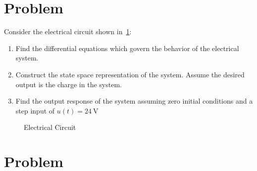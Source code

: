 \documentclass[titlepage, 11pt, reqno]{article}    %
\begin{document}
\section{Problem}
Consider the electrical circuit shown in~\cref{fig:elec_circuit}:
\begin{enumerate}
    \item Find the differential equations which govern the behavior of the electrical system.
    \item Construct the state space representation of the system. 
        Assume the desired output is the charge in the system.
    \item Find the output response of the system assuming zero initial conditions and a step input of \(u(t) = \SI{24}{\volt}\)
\end{enumerate}
\begin{figure}[htbp]
\centering
\begin{scaletikzpicturetowidth}{0.5\textwidth}
\end{scaletikzpicturetowidth}
\caption{Electrical Circuit~\label{fig:elec_circuit}}
\end{figure}
\clearpage

\section{Problem}
\end{document}
